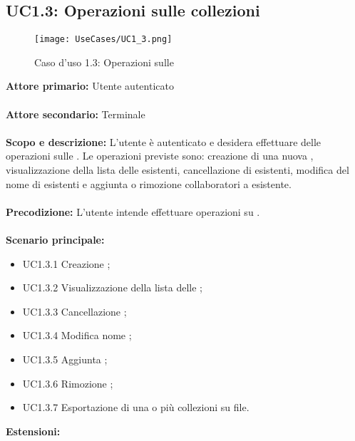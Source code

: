\documentclass{scalatekids-article}
\begin{document}
\subsection{UC1.3: Operazioni sulle collezioni}
\begin{figure}[H]
  \begin{center}
    \texttt{[image: UseCases/UC1\_3.png]}
    \caption*{Caso d'uso 1.3: Operazioni sulle }
  \end{center}
\end{figure}
\textbf{Attore primario:} Utente autenticato\\ \\
\textbf{Attore secondario:} Terminale\\ \\
\textbf{Scopo e descrizione:} L'utente è autenticato e desidera effettuare delle operazioni sulle . Le operazioni previste sono:
creazione di una nuova , visualizzazione della lista delle  esistenti, cancellazione di  esistenti, modifica del nome di  esistenti e
aggiunta o rimozione collaboratori a  esistente.\\ \\
\textbf{Precodizione:} L'utente intende effettuare operazioni su .\\ \\
\textbf{Scenario principale:}
\begin{itemize}
  \item UC1.3.1 Creazione ;
  \item UC1.3.2 Visualizzazione della lista delle ;
  \item UC1.3.3 Cancellazione ;
  \item UC1.3.4 Modifica nome ;
  \item UC1.3.5 Aggiunta ;
  \item UC1.3.6 Rimozione ;
  \item UC1.3.7 Esportazione di una o più collezioni su file.
\end{itemize}
\textbf{Estensioni:}
\end{document}
